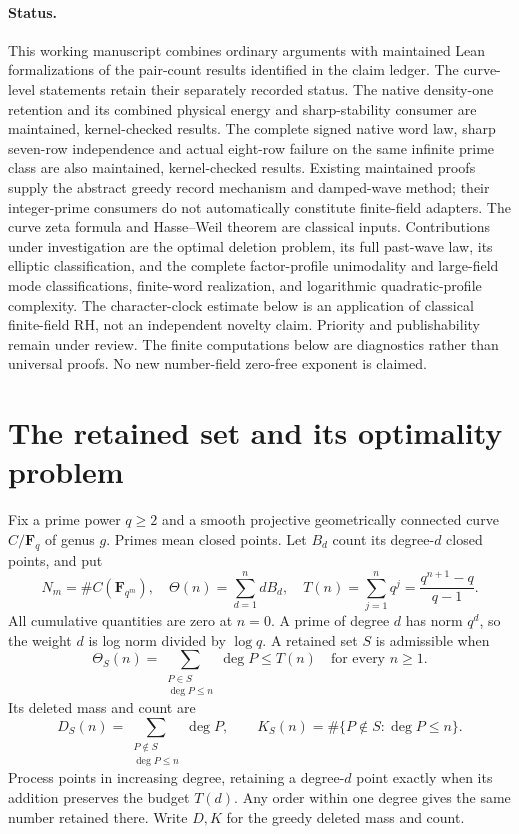 \documentclass[11pt]{article}
\newcommand{\F}{\mathbf F}
\begin{document}
\paragraph{Status.}
This working manuscript combines ordinary arguments with maintained Lean
formalizations of the pair-count results identified in the claim ledger.
The curve-level statements retain their separately recorded status.
The native density-one retention and its combined physical energy and
sharp-stability consumer are maintained, kernel-checked results.
The complete signed native word law, sharp seven-row independence and
actual eight-row failure on the same infinite prime class are also
maintained, kernel-checked results.
Existing maintained proofs supply
the abstract greedy record mechanism and damped-wave method; their
integer-prime consumers do not automatically constitute finite-field
adapters. The curve zeta formula and Hasse--Weil theorem are classical
inputs. Contributions under investigation are the optimal deletion
problem, its full past-wave law, its elliptic classification, and the
complete factor-profile unimodality and large-field mode classifications,
finite-word realization, and logarithmic quadratic-profile complexity.
The character-clock estimate below is an application of classical
finite-field RH, not an independent novelty claim.
Priority and publishability remain under review. The finite computations
below are diagnostics rather than universal proofs. No new number-field
zero-free exponent is claimed.

\section{The retained set and its optimality problem}
Fix a prime power \(q\geq2\) and a smooth projective geometrically connected
curve \(C/\F_q\) of genus \(g\). Primes mean closed points. Let \(B_d\)
count its degree-\(d\) closed points, and put
\[
 N_m=\#C(\F_{q^m}),\quad
 \Theta(n)=\sum_{d=1}^n dB_d,\quad
 T(n)=\sum_{j=1}^nq^j=\frac{q^{n+1}-q}{q-1}.
\]
All cumulative quantities are zero at \(n=0\). A prime of degree \(d\)
has norm \(q^d\), so the weight \(d\) is log norm divided by \(\log q\).
A retained set \(S\) is admissible when
\[
 \Theta_S(n)=\sum_{\substack{P\in S\\\deg P\leq n}}\deg P\leq T(n)
 \quad\text{for every }n\geq1.
\]
Its deleted mass and count are
\[
 D_S(n)=\sum_{\substack{P\notin S\\\deg P\leq n}}\deg P,\qquad
 K_S(n)=\#\{P\notin S:\deg P\leq n\}.
\]
Process points in increasing degree, retaining a degree-\(d\) point
exactly when its addition preserves the budget \(T(d)\). Any order
within one degree gives the same number retained there. Write \(D,K\)
for the greedy deleted mass and count.
\end{document}
